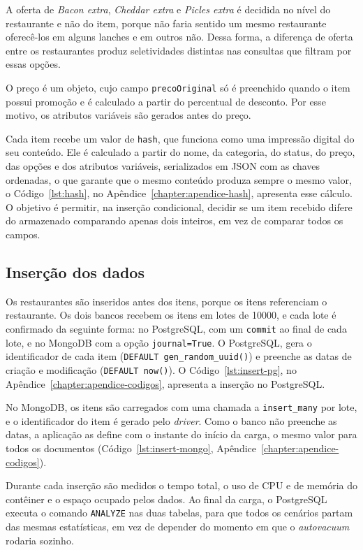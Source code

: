 A oferta de \textit{Bacon extra}, \textit{Cheddar extra} e \textit{Picles extra} é decidida no nível do restaurante e não do item, porque não faria sentido um mesmo restaurante oferecê-los em alguns lanches e em outros não. Dessa forma, a diferença de oferta entre os restaurantes produz seletividades distintas nas consultas que filtram por essas opções. 

O preço é um objeto, cujo campo \texttt{precoOriginal} só é preenchido quando o item possui promoção e é calculado a partir do percentual de desconto. Por esse motivo, os atributos variáveis são gerados antes do preço.

Cada item recebe um valor de \texttt{hash}, que funciona como uma impressão digital do seu conteúdo. Ele é calculado a partir do nome, da categoria, do status, do preço, das opções e dos atributos variáveis, serializados em JSON com as chaves ordenadas, o que garante que o mesmo conteúdo produza sempre o mesmo valor, o Código~\ref{lst:hash}, no Apêndice~\ref{chapter:apendice-hash}, apresenta esse cálculo. O objetivo é permitir, na inserção condicional, decidir se um item recebido difere do armazenado comparando apenas dois inteiros, em vez de comparar todos os campos.

\subsection{Inserção dos dados}

Os restaurantes são inseridos antes dos itens, porque os itens referenciam o restaurante. 
Os dois bancos recebem os itens em lotes de 10000, e cada lote é confirmado da seguinte forma: 
no PostgreSQL, com um \texttt{commit} ao final de cada lote, e no MongoDB com a opção 
\texttt{journal=True}. 
O PostgreSQL, gera o identificador de cada 
item (\texttt{DEFAULT gen\_random\_uuid()}) e preenche as datas de criação e modificação 
(\texttt{DEFAULT now()}). O Código~\ref{lst:insert-pg}, no Apêndice~\ref{chapter:apendice-codigos}, apresenta a inserção no PostgreSQL.

No MongoDB, os itens são carregados com uma chamada a \texttt{insert\_many} por lote, e o identificador do
item é gerado pelo \textit{driver}. Como o banco não preenche as datas, a aplicação as define com o instante
do início da carga, o mesmo valor para todos os documentos (Código~\ref{lst:insert-mongo}, Apêndice~\ref{chapter:apendice-codigos}).


Durante cada inserção são medidos o tempo total, o uso de CPU e de memória do contêiner e o 
espaço ocupado pelos dados. Ao final da carga, o PostgreSQL executa o comando
\texttt{ANALYZE} nas duas tabelas, para que todos os cenários partam das mesmas estatísticas, em vez de
depender do momento em que o \textit{autovacuum} rodaria sozinho.

